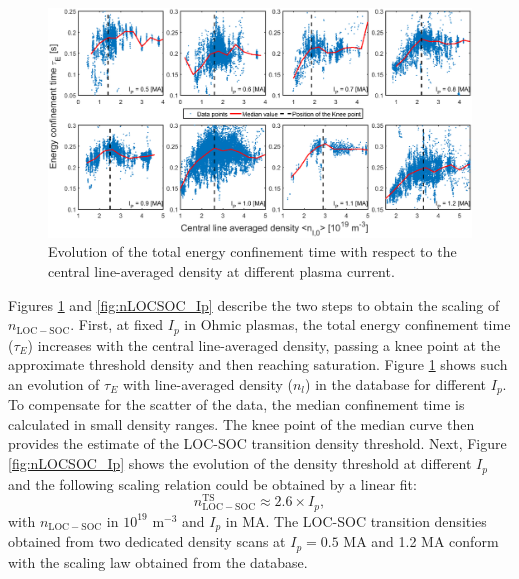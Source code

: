\begin{figure}[h]
\begin{centering}
\includegraphics[scale=0.5]{fig_tau_vs_ne.eps}
\par\end{centering}
\caption{Evolution of the total energy confinement time with respect to the central line-averaged density at different plasma current.}
\label{fig:tau_vs_ne}
\end{figure}


Figures \ref{fig:tau_vs_ne} and \ref{fig:nLOCSOC_Ip} describe the two steps to obtain the scaling of $n_\mathrm{LOC-SOC}$. First, at fixed $I_p$ in Ohmic plasmas, the total energy confinement time ($\tau_E$) increases with the central line-averaged density, passing a knee point at the approximate threshold density and then reaching saturation. Figure \ref{fig:tau_vs_ne} shows such an evolution of $\tau_E$ with line-averaged density ($n_l$) in the database for different $I_p$. To compensate for the scatter of the data, the median confinement time is calculated in small density ranges. The knee point of the median curve then provides the estimate of the LOC-SOC transition density threshold. Next, Figure \ref{fig:nLOCSOC_Ip} shows the evolution of the density threshold at different $I_p$ and the following scaling relation could be obtained by a linear fit:%
\begin{equation}
  n_\mathrm{LOC-SOC}^\mathrm{TS} \approx 2.6 \times I_p,
\end{equation}
\noindent with $n_\mathrm{LOC-SOC}$ in $10^{19}$ m$^{-3}$ and $I_p$ in MA. The LOC-SOC transition densities obtained from two dedicated density scans at $I_p= 0.5$ MA and 1.2 MA \cite{Arnichand_2014_NF} conform with the scaling law obtained from the database.


